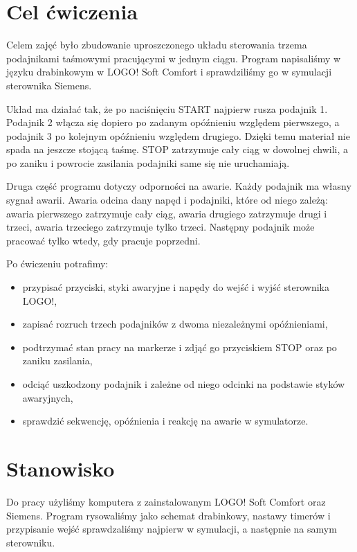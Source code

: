 \newpage
\section{Cel ćwiczenia}

Celem zajęć było zbudowanie uproszczonego układu sterowania trzema podajnikami taśmowymi pracującymi w jednym ciągu. Program napisaliśmy w języku drabinkowym w LOGO! Soft Comfort i sprawdziliśmy go w symulacji sterownika Siemens.

Układ ma działać tak, że po naciśnięciu START najpierw rusza podajnik 1. Podajnik 2 włącza się dopiero po zadanym opóźnieniu względem pierwszego, a podajnik 3 po kolejnym opóźnieniu względem drugiego. Dzięki temu materiał nie spada na jeszcze stojącą taśmę. STOP zatrzymuje cały ciąg w dowolnej chwili, a po zaniku i powrocie zasilania podajniki same się nie uruchamiają.

Druga część programu dotyczy odporności na awarie. Każdy podajnik ma własny sygnał awarii. Awaria odcina dany napęd i podajniki, które od niego zależą: awaria pierwszego zatrzymuje cały ciąg, awaria drugiego zatrzymuje drugi i trzeci, awaria trzeciego zatrzymuje tylko trzeci. Następny podajnik może pracować tylko wtedy, gdy pracuje poprzedni.

Po ćwiczeniu potrafimy:

\begin{itemize}
    \item przypisać przyciski, styki awaryjne i napędy do wejść i wyjść sterownika LOGO!,
    \item zapisać rozruch trzech podajników z dwoma niezależnymi opóźnieniami,
    \item podtrzymać stan pracy na markerze i zdjąć go przyciskiem STOP oraz po zaniku zasilania,
    \item odciąć uszkodzony podajnik i zależne od niego odcinki na podstawie styków awaryjnych,
    \item sprawdzić sekwencję, opóźnienia i reakcję na awarie w symulatorze.
\end{itemize}

\section{Stanowisko}

Do pracy użyliśmy komputera z zainstalowanym LOGO! Soft Comfort oraz Siemens. Program rysowaliśmy jako schemat drabinkowy, nastawy timerów i przypisanie wejść sprawdzaliśmy najpierw w symulacji, a następnie na samym sterowniku.

